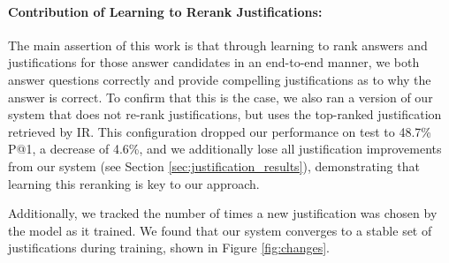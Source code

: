 \vspace{-2mm}
\paragraph{Contribution of Learning to Rerank Justifications:}
The main assertion of this work is that through learning to rank answers and justifications for those answer candidates in an end-to-end manner, we both answer questions correctly and provide compelling justifications as to why the answer is correct.  To confirm that this is the case, we also ran a version of our system that does not re-rank justifications, but uses the top-ranked justification retrieved by IR.  This configuration dropped our performance on test to 48.7\% P@1, a decrease of 4.6\%, and we additionally lose all justification improvements from our system (see Section \ref{sec:justification_results}), demonstrating that learning this reranking is key to our approach.

Additionally, we tracked the number of times a new justification was chosen by the model as it trained. We found that our system converges to a stable set of justifications during training, shown in Figure \ref{fig:changes}.







